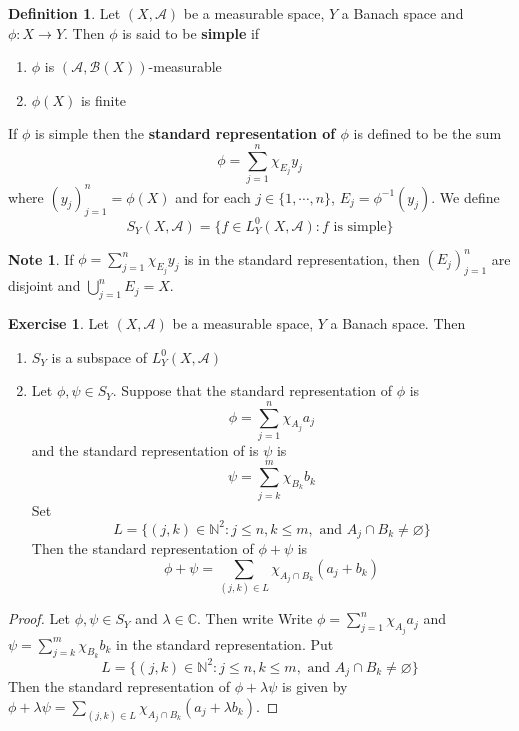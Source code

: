 \documentclass[12pt]{amsart}
\theoremstyle{definition}
\newtheorem{defn}[definition]{Definition}
\newtheorem{note}[definition]{Note}
\newtheorem{ex}[definition]{Exercise}
\newcommand{\lam}{\lambda}
\newcommand{\C}{\mathbb{C}}
\newcommand{\N}{\mathbb{N}}
\newcommand{\MA}{\mathcal{A}}
\newcommand{\MB}{\mathcal{B}}
\newcommand{\ld}[1]{\label{defn:#1}}
\begin{document}
	\begin{defn} \ld{00000} 
		Let $(X, \MA)$ be a measurable space, $Y$ a Banach space and $\phi: X \rightarrow Y$. Then $\phi$ is said to be \textbf{simple} if 
		\begin{enumerate}
			\item $\phi$ is $(\MA, \MB(X))$-measurable
			\item $\phi(X)$ is finite
		\end{enumerate}
		If $\phi$ is simple then the \textbf{standard representation of $\phi$} is defined to be the sum $$\phi = \sum\limits_{j=1}^n \chi_{E_j}y_j$$ where $(y_j)_{j=1}^n = \phi(X)$ and for each $j \in \{1, \cdots, n\}$, $E_j = \phi^{-1}(y_j)$. We define $$S_Y(X, \MA) = \{f \in L_Y^0(X, \MA): f \text{ is simple}\}$$
	\end{defn}
	
	\begin{note}
		If $\phi = \sum\limits_{j=1}^n \chi_{E_j}y_j$ is in the standard representation, then $(E_j)_{j=1}^n$ are disjoint and $\bigcup\limits_{j=1}^n E_j = X$.
	\end{note}

	\begin{ex}
		Let $(X, \MA)$ be a measurable space, $Y$ a Banach space. Then 
		\begin{enumerate}
			\item $S_Y $ is a subspace of $L^0_Y(X, \MA)$
			\item Let $\phi, \psi \in S_Y$. Suppose that the standard representation of $\phi$ is 
			$$\phi = \sum\limits_{j=1}^n\chi_{A_j}a_j$$ 
			and the standard representation of is $\psi$ is 
			$$\psi = \sum\limits_{j=k}^m\chi_{B_k}b_k$$ 
			Set
			$$L = \{(j,k) \in \N^2: j \leq n, k \leq m, \text{ and } A_j \cap B_k \neq \varnothing\}$$  
			Then the standard representation of $\phi + \psi$ is 
			$$\phi + \psi = \sum\limits_{(j,k) \in L} \chi_{A_j \cap B_k}(a_j + b_k)$$
		\end{enumerate} 
	\end{ex}

	\begin{proof}
		Let $\phi, \psi \in S_Y$ and $\lam \in \C$. Then write Write $\phi = \sum\limits_{j=1}^n\chi_{A_j}a_j$ and $\psi = \sum\limits_{j=k}^m\chi_{B_k}b_k$ in the standard representation. Put $$L = \{(j,k) \in \N^2: j \leq n, k \leq m, \text{ and } A_j \cap B_k \neq \varnothing\}$$ 
		Then the standard representation of $\phi + \lam \psi$ is given by  $\phi + \lam \psi = \sum\limits_{(j,k) \in L} \chi_{A_j \cap B_k}(a_j + \lam b_k)$.
		
	\end{proof}
	
\end{document}
